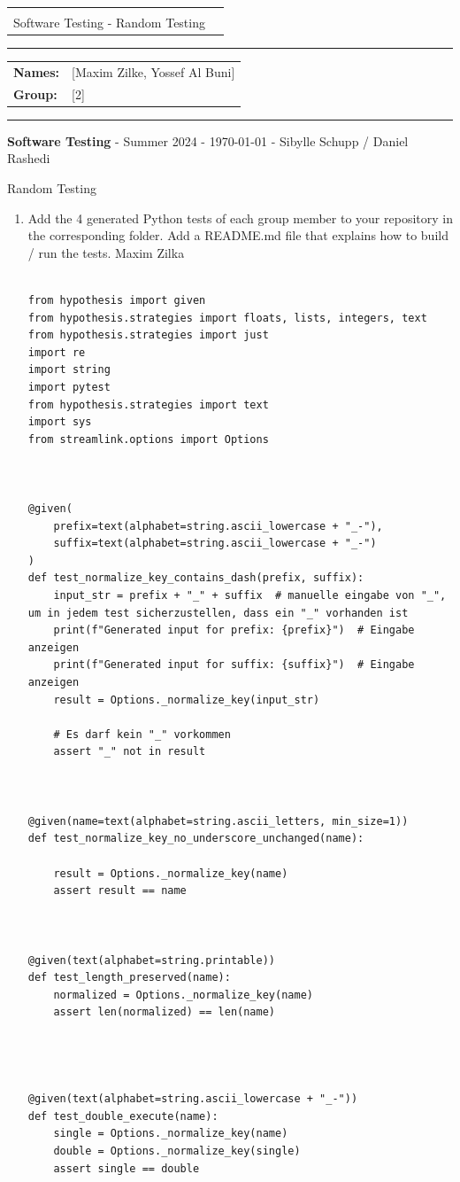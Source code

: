 \documentclass[a4paper]{scrreprt}
\newcommand{\baseinfo}[5]{
  \begin{center}
    \begin{tabular}{p{15cm}r}
      \vspace{-4.5pt}{ \Large \bfseries #1} & \multirow{2}{*}{} \\[0.4cm]
      #2 & \\[0.5cm]
    \end{tabular}
  \end{center}
  \vspace{-18pt}\hrule\vspace{6pt}
  \begin{tabular}{ll}
    \textbf{Names:} & #4\\
    \textbf{Group:} & #5\\
  \end{tabular}
  \vspace{4pt}\hrule\vspace{2pt}
  \footnotesize \textbf{Software Testing} \hfil - \hfil Summer 2024 \hfil - \hfil #3 \hfil - \hfil Sibylle Schupp / Daniel Rashedi \hfil \\
}
\newcounter{question}
\newcommand{\projectinfo}[4]{\baseinfo{Project - Submission Sheet}{#1}{#2}{#3}{#4}}
\newcommand{\name}{[Maxim Zilke, Yossef Al Buni]}
\newcommand{\group}{[2]}
\begin{document}
\projectinfo{Software Testing - Random Testing\small}{\today}{\name}{\group}


\begin{question}{Random Testing}
  \begin{enumerate}[topsep=0pt, leftmargin=*]
    \item Add the 4 generated Python tests of each group member to your repository in the corresponding folder. Add a README.md file that explains how to build / run the tests.
Maxim Zilka
                \begin{lstlisting}[caption={Hypothesis-Test für \_normalize\_key}, label={lst:normalize-key}]

from hypothesis import given
from hypothesis.strategies import floats, lists, integers, text
from hypothesis.strategies import just
import re
import string
import pytest
from hypothesis.strategies import text
import sys
from streamlink.options import Options



@given(
    prefix=text(alphabet=string.ascii_lowercase + "_-"),
    suffix=text(alphabet=string.ascii_lowercase + "_-")
)
def test_normalize_key_contains_dash(prefix, suffix):
    input_str = prefix + "_" + suffix  # manuelle eingabe von "_", um in jedem test sicherzustellen, dass ein "_" vorhanden ist
    print(f"Generated input for prefix: {prefix}")  # Eingabe anzeigen
    print(f"Generated input for suffix: {suffix}")  # Eingabe anzeigen
    result = Options._normalize_key(input_str)

    # Es darf kein "_" vorkommen 
    assert "_" not in result



@given(name=text(alphabet=string.ascii_letters, min_size=1))
def test_normalize_key_no_underscore_unchanged(name):
 
    result = Options._normalize_key(name)
    assert result == name



@given(text(alphabet=string.printable))
def test_length_preserved(name):
    normalized = Options._normalize_key(name)
    assert len(normalized) == len(name)




@given(text(alphabet=string.ascii_lowercase + "_-"))
def test_double_execute(name):
    single = Options._normalize_key(name)
    double = Options._normalize_key(single)
    assert single == double
\end{lstlisting}



\end{enumerate}
\end{question}
\end{document}
